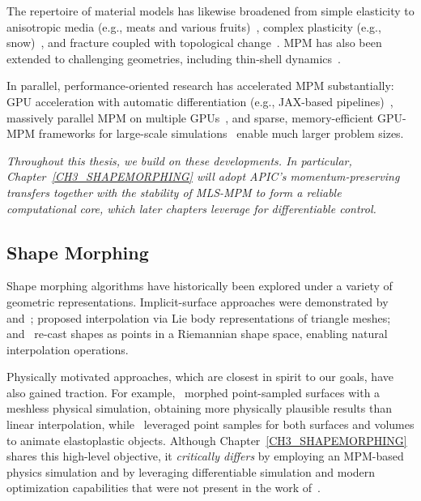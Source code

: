     The repertoire of material models has likewise broadened from simple elasticity to anisotropic media (e.g., meats and various fruits)~\citep{10.1145/3386569.3392428}, complex plasticity (e.g., snow)~\citep{2013-mpm}, and fracture coupled with topological change~\citep{2019-cdmpm,10.1145/3340259}. MPM has also been extended to challenging geometries, including thin-shell dynamics~\citep{guo2018material}.
    
    In parallel, performance-oriented research has accelerated MPM substantially: GPU acceleration with automatic differentiation (e.g., JAX-based pipelines)~\citep{du2025jax}, massively parallel MPM on multiple GPUs~\citep{wang2020massively}, and sparse, memory-efficient GPU-MPM frameworks for large-scale simulations~\citep{chen2025sparse} enable much larger problem sizes.
    
    \emph{Throughout this thesis, we build on these developments. In particular, Chapter~\ref{CH3_SHAPEMORPHING} will adopt APIC’s momentum-preserving transfers together with the stability of MLS-MPM to form a reliable computational core, which later chapters leverage for differentiable control.}

\subsection{Shape Morphing}
    Shape morphing algorithms have historically been explored under a variety of geometric representations. Implicit-surface approaches were demonstrated by~\citet{turk2005shape} and~\citet{breen2001level}; \citet{bansal2018lie} proposed interpolation via Lie body representations of triangle meshes; and~\citet{kilian2007geometric} re-cast shapes as points in a Riemannian shape space, enabling natural interpolation operations.
    
    Physically motivated approaches, which are closest in spirit to our goals, have also gained traction. For example,~\citet{bao2005physically} morphed point-sampled surfaces with a meshless physical simulation, obtaining more physically plausible results than linear interpolation, while~\citet{muller2004point} leveraged point samples for both surfaces and volumes to animate elastoplastic objects. Although Chapter~\ref{CH3_SHAPEMORPHING} shares this high-level objective, it \emph{critically differs} by employing an MPM-based physics simulation and by leveraging differentiable simulation and modern optimization capabilities that were not present in the work of~\citet{muller2004point}.
    
